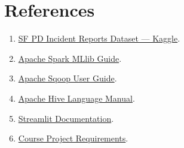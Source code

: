 \documentclass[12pt,a4paper]{article}
\begin{document}
\section*{References}

\begin{enumerate}
    \item \href{https://www.kaggle.com/datasets/vivovinco/san-francisco-incident-reports-2018present}{SF PD Incident Reports Dataset --- Kaggle}.
    \item \href{https://spark.apache.org/docs/latest/ml-guide.html}{Apache Spark MLlib Guide}.
    \item \href{https://sqoop.apache.org/docs/1.4.7/SqoopUserGuide.html}{Apache Sqoop User Guide}.
    \item \href{https://cwiki.apache.org/confluence/display/Hive/LanguageManual}{Apache Hive Language Manual}.
    \item \href{https://docs.streamlit.io}{Streamlit Documentation}.
    \item \href{https://firas-jolha.github.io/bigdata/html/bs/BS%20-%20Final%20Project.html}{Course Project Requirements}.
\end{enumerate}
\end{document}
